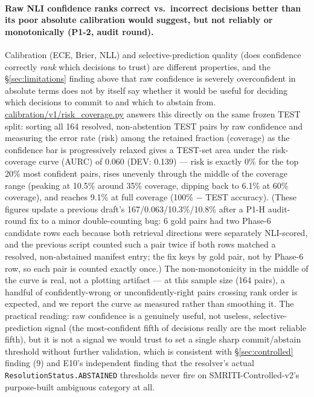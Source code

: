 \paragraph{Raw NLI confidence ranks correct vs.\ incorrect decisions
better than its poor absolute calibration would suggest, but not
reliably or monotonically (P1-2, audit round).} Calibration (ECE, Brier,
NLL) and selective-prediction quality (does confidence correctly
\emph{rank} which decisions to trust) are different properties, and the
\S\ref{sec:limitations} finding above that raw confidence is severely
overconfident in absolute terms does not by itself say whether it would
be useful for deciding which decisions to commit to and which to
abstain from. \url{calibration/v1/risk_coverage.py}
answers this directly on the same frozen TEST split: sorting all 164
resolved, non-abstention TEST pairs by raw confidence and measuring the
error rate (risk) among the retained fraction (coverage) as the
confidence bar is progressively relaxed gives a TEST-set area under the
risk-coverage curve (AURC) of 0.060 (DEV: 0.139) --- risk is exactly
0\% for the top 20\% most confident pairs, rises unevenly through the
middle of the coverage range (peaking at 10.5\% around 35\% coverage,
dipping back to 6.1\% at 60\% coverage), and reaches 9.1\% at full
coverage (100\% $-$ TEST accuracy). (These figures update a previous
draft's 167/0.063/10.3\%/10.8\% after a P1-H audit-round fix to a minor
double-counting bug: 6 gold pairs had two Phase-6 candidate rows each
because both retrieval directions were separately NLI-scored, and the
previous script counted such a pair twice if both rows matched a
resolved, non-abstained manifest entry; the fix keys by gold pair, not
by Phase-6 row, so each pair is counted exactly once.) The
non-monotonicity in the middle of the curve is real, not a plotting
artifact --- at this sample size (164 pairs), a handful of
confidently-wrong or unconfidently-right pairs crossing rank order is
expected, and we report the curve as measured rather than smoothing it.
The practical reading: raw confidence is a genuinely useful, not
useless, selective-prediction signal (the most-confident fifth of
decisions really are the most reliable fifth), but it is not a signal we
would trust to set a single sharp commit/abstain threshold without
further validation, which is consistent with \S\ref{sec:controlled}
finding (9) and E10's independent finding that the resolver's actual
\texttt{ResolutionStatus.ABSTAINED} thresholds never fire on
SMRITI-Controlled-v2's purpose-built ambiguous category at all.


